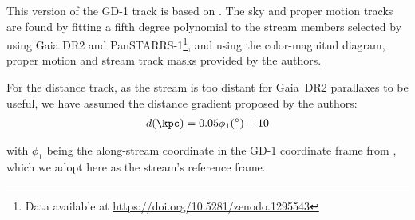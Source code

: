 This version of the GD-1 track is based on \citet{PriceWhelanBonaca2018_gd1}. The sky and proper motion tracks are found by fitting a fifth degree polynomial to the stream members selected by \citet{PriceWhelanBonaca2018_gd1} using Gaia DR2 and PanSTARRS-1\footnote{Data available at \url{https://doi.org/10.5281/zenodo.1295543}}, and using the color-magnitud diagram, proper motion and stream track masks provided by the authors.

For the distance track, as the stream is too distant for Gaia~DR2 parallaxes to be useful, we have assumed the distance gradient proposed by the authors:
\begin{eqnarray*}
d (\kpc) = 0.05\phi_1(^\circ) +10
\end{eqnarray*}

with $\phi_1$ being the along-stream coordinate in the GD-1 coordinate frame from \citet{Koposov2010}, which we adopt here
as the stream's reference frame.

